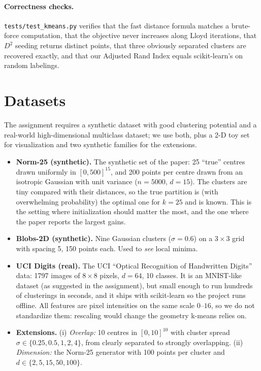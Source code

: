 \documentclass[11pt,a4paper]{article}
\begin{document}
\paragraph{Correctness checks.} \texttt{tests/test\_kmeans.py} verifies that the
fast distance formula matches a brute-force computation, that the objective never
increases along Lloyd iterations, that $D^2$ seeding returns distinct points, that
three obviously separated clusters are recovered exactly, and that our Adjusted
Rand Index equals scikit-learn's on random labelings.

\section{Datasets}

The assignment requires a synthetic dataset with good clustering potential and a
real-world high-dimensional multiclass dataset; we use both, plus a 2-D toy set
for visualization and two synthetic families for the extensions.

\begin{itemize}
\item \textbf{Norm-25 (synthetic).} The synthetic set of the paper: 25 ``true''
centres drawn uniformly in $[0,500]^{15}$, and 200 points per centre drawn from an
isotropic Gaussian with unit variance ($n=5000$, $d=15$). The clusters are tiny
compared with their distances, so the true partition is (with overwhelming
probability) the optimal one for $k=25$ and is known. This is the setting where
initialization should matter the most, and the one where the paper reports the
largest gains.
\item \textbf{Blobs-2D (synthetic).} Nine Gaussian clusters ($\sigma=0.6$) on a
$3\times3$ grid with spacing 5, 150 points each. Used to \emph{see} local minima.
\item \textbf{UCI Digits (real).} The UCI ``Optical Recognition of Handwritten
Digits'' data: 1797 images of $8\times8$ pixels, $d=64$, 10 classes. It is an
MNIST-like dataset (as suggested in the assignment), but small enough to run
hundreds of clusterings in seconds, and it ships with scikit-learn so the project
runs offline. All features are pixel intensities on the same scale $0$--$16$, so
we do not standardize them: rescaling would change the geometry k-means relies on.
\item \textbf{Extensions.} (i) \emph{Overlap:} 10 centres in $[0,10]^{10}$ with
cluster spread $\sigma\in\{0.25,0.5,1,2,4\}$, from clearly separated to strongly
overlapping. (ii) \emph{Dimension:} the Norm-25 generator with 100 points per
cluster and $d\in\{2,5,15,50,100\}$.
\end{itemize}
\end{document}
